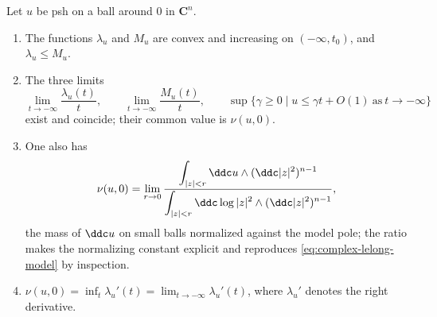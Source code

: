 \begin{proposition}\label{prop:ch51-lelong-three}
Let $u$ be psh on a ball around $0$ in $\mathbf C^n$.
\begin{enumerate}
\item\label{itm:ch51-lelong:convex}
      The functions $\lambda_u$ and $M_u$ are convex and increasing on
      $(-\infty,t_0)$, and $\lambda_u\leq M_u$.
\item\label{itm:ch51-lelong:limits}
      The three limits
      \[
       \lim_{t\to-\infty}\frac{\lambda_u(t)}{t},
       \qquad
       \lim_{t\to-\infty}\frac{M_u(t)}{t},
       \qquad
       \sup\{\gamma\geq0\mid u\leq\gamma t+O(1)\ \text{as}\ t\to-\infty\}
      \]
      exist and coincide; their common value is $\nu(u,0)$.
\item\label{itm:ch51-lelong:mass}
      One also has
      \[
       \nu(u,0)
       =\lim_{r\to0}
         \frac{\displaystyle\int_{|z|<r}\ddc u\wedge(\ddc|z|^2)^{n-1}}
              {\displaystyle\int_{|z|<r}
                 \ddc\log|z|^2\wedge(\ddc|z|^2)^{n-1}},
      \]
      the mass of $\ddc u$ on small balls normalized against the model
      pole; the ratio makes the normalizing constant explicit and
      reproduces \eqref{eq:complex-lelong-model} by inspection.
\item\label{itm:ch51-lelong:slope}
      $\nu(u,0)=\inf_{t}\lambda_u'(t)=\lim_{t\to-\infty}\lambda_u'(t)$,
      where $\lambda_u'$ denotes the right derivative.
\end{enumerate}
\end{proposition}

